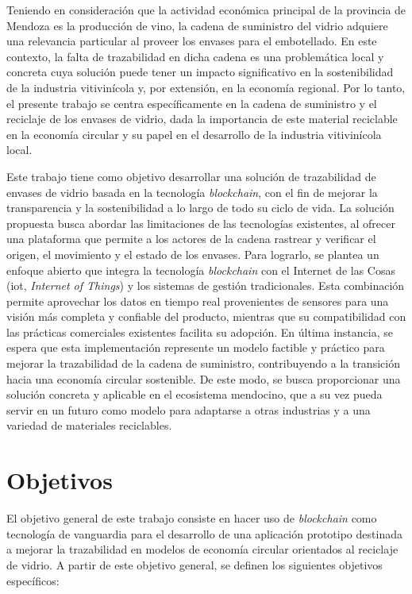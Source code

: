 Teniendo en consideración que la actividad económica principal de la provincia de Mendoza es la producción de vino, la cadena de suministro del vidrio adquiere una relevancia particular al proveer los envases para el embotellado. En este contexto, la falta de trazabilidad en dicha cadena es una problemática local y concreta cuya solución puede tener un impacto significativo en la sostenibilidad de la industria vitivinícola y, por extensión, en la economía regional. Por lo tanto, el presente trabajo se centra específicamente en la cadena de suministro y el reciclaje de los envases de vidrio, dada la importancia de este material reciclable en la economía circular y su papel en el desarrollo de la industria vitivinícola local.

Este trabajo tiene como objetivo desarrollar una solución de trazabilidad de envases de vidrio basada en la tecnología \textit{blockchain}, con el fin de mejorar la transparencia y la sostenibilidad a lo largo de todo su ciclo de vida. La solución propuesta busca abordar las limitaciones de las tecnologías existentes, al ofrecer una plataforma que permite a los actores de la cadena rastrear y verificar el origen, el movimiento y el estado de los envases. Para lograrlo, se plantea un enfoque abierto que integra la tecnología \textit{blockchain} con el Internet de las Cosas (\gls{iot}, \textit{Internet of Things}) y los sistemas de gestión tradicionales. Esta combinación permite aprovechar los datos en tiempo real provenientes de sensores para una visión más completa y confiable del producto, mientras que su compatibilidad con las prácticas comerciales existentes facilita su adopción. En última instancia, se espera que esta implementación represente un modelo factible y práctico para mejorar la trazabilidad de la cadena de suministro, contribuyendo a la transición hacia una economía circular sostenible. De este modo, se busca proporcionar una solución concreta y aplicable en el ecosistema mendocino, que a su vez pueda servir en un futuro como modelo para adaptarse a otras industrias y a una variedad de materiales reciclables.

\section{Objetivos}
\label{sec:goals}

El objetivo general de este trabajo consiste en hacer uso de \textit{blockchain} como tecnología de vanguardia para el desarrollo de una aplicación prototipo destinada a mejorar la trazabilidad en modelos de economía circular orientados al reciclaje de vidrio. A partir de este objetivo general, se definen los siguientes objetivos específicos:

